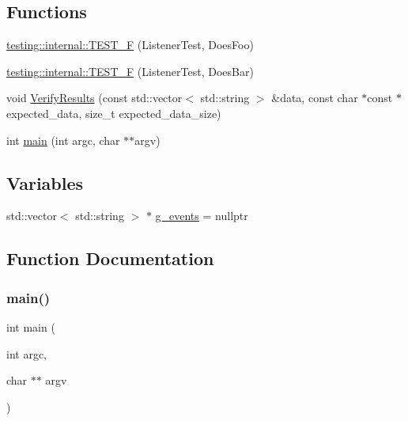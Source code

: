 \subsection*{Functions}
\begin{DoxyCompactItemize}
\item 
\mbox{\hyperlink{namespacetesting_1_1internal_a7e113e9c70d45d89fe1703e58ff083b9}{testing\+::internal\+::\+T\+E\+S\+T\+\_\+F}} (Listener\+Test, Does\+Foo)
\item 
\mbox{\hyperlink{namespacetesting_1_1internal_a02cef32090020d164460dd3d9f8e2852}{testing\+::internal\+::\+T\+E\+S\+T\+\_\+F}} (Listener\+Test, Does\+Bar)
\item 
void \mbox{\hyperlink{_obj__test_2lib_2googletest-master_2googletest_2test_2googletest-listener-test_8cc_ab9d583cd17d35925ad3d12f864d57fe9}{Verify\+Results}} (const std\+::vector$<$ std\+::string $>$ \&data, const char $\ast$const $\ast$expected\+\_\+data, size\+\_\+t expected\+\_\+data\+\_\+size)
\item 
int \mbox{\hyperlink{_obj__test_2lib_2googletest-master_2googletest_2test_2googletest-listener-test_8cc_a3c04138a5bfe5d72780bb7e82a18e627}{main}} (int argc, char $\ast$$\ast$argv)
\end{DoxyCompactItemize}
\subsection*{Variables}
\begin{DoxyCompactItemize}
\item 
std\+::vector$<$ std\+::string $>$ $\ast$ \mbox{\hyperlink{_obj__test_2lib_2googletest-master_2googletest_2test_2googletest-listener-test_8cc_a32a264046f3603db11e6fcdaea5fb094}{g\+\_\+events}} = nullptr
\end{DoxyCompactItemize}


\subsection{Function Documentation}
\mbox{\label{_obj__test_2lib_2googletest-master_2googletest_2test_2googletest-listener-test_8cc_a3c04138a5bfe5d72780bb7e82a18e627}} 
\subsubsection{\texorpdfstring{main()}{main()}}
{\footnotesize\ttfamily int main (\begin{DoxyParamCaption}\item[{int}]{argc,  }\item[{char $\ast$$\ast$}]{argv }\end{DoxyParamCaption})}

